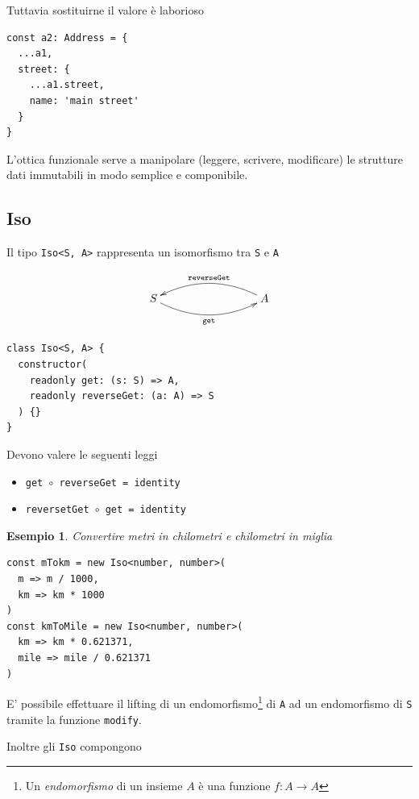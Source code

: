 \documentclass[12pt]{article}
\newtheorem{example}{Esempio}
\begin{document}
Tuttavia sostituirne il valore è laborioso

\begin{verbatim}
const a2: Address = {
  ...a1,
  street: {
    ...a1.street,
    name: 'main street'
  }
}
\end{verbatim}

L'ottica funzionale serve a manipolare (leggere, scrivere, modificare) le strutture dati immutabili in modo semplice e componibile.

\subsection{Iso}

Il tipo \texttt{Iso<S, A>} rappresenta un isomorfismo tra \texttt{S} e \texttt{A}

\[
\xymatrixrowsep{3cm}
\xymatrixcolsep{3cm}
\xymatrix{
  S \ar@/_0.5cm/[r]_{\texttt{get}} & A \ar@/_0.5cm/[l]_{\texttt{reverseGet}}
}
\]

\begin{verbatim}
class Iso<S, A> {
  constructor(
    readonly get: (s: S) => A,
    readonly reverseGet: (a: A) => S
  ) {}
}
\end{verbatim}

Devono valere le seguenti leggi

\begin{itemize}
  \item \texttt{get $\circ$ reverseGet = identity}
  \item \texttt{reversetGet $\circ$ get = identity}
\end{itemize}

\begin{example}

Convertire metri in chilometri e chilometri in miglia

\begin{verbatim}
const mTokm = new Iso<number, number>(
  m => m / 1000,
  km => km * 1000
)
const kmToMile = new Iso<number, number>(
  km => km * 0.621371,
  mile => mile / 0.621371
)
\end{verbatim}
\end{example}

E' possibile effettuare il lifting di un endomorfismo\footnote{Un \emph{endomorfismo} di un insieme $A$ è una funzione $f: A \rightarrow A$}
di \texttt{A} ad un endomorfismo di \texttt{S} tramite la funzione \texttt{modify}.

Inoltre gli \texttt{Iso} compongono
\end{document}
